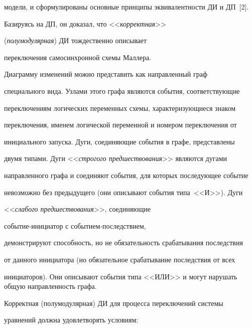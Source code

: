 модели, и сформулированы основные принципы эквивалентности ДИ и ДП~[2]. 


Базируясь на ДП, он доказал, что <<\textit{корректная}>> 


(\textit{полумодулярная}) ДИ тождественно описывает 


переключения самосинхронной схемы Маллера. 


      


      Диаграмму изменений можно представить как направленный граф 


специального вида. Узлами этого графа являются события, соответствующие 


переключениям логических переменных схемы, характеризующиеся знаком 


переключения, именем логической переменной и номером переключения от 


инициального запуска. Дуги, соединяющие события в графе, представлены 


двумя типами. Дуги <<\textit{строгого предшествования}>> являются дугами 


направленного графа и соединяют события, для которых последующее событие 


невозможно без предыдущего (они описывают события типа~<<И>>). Дуги 


<<\textit{слабого предшествования}>>, соединяющие 


      со\-бы\-тие-ини\-ци\-а\-тор с со\-бы\-ти\-ем-по\-след\-ст\-ви\-ем, 


демонстрируют способность, но не обязательность срабатывания последствия 


от данного инициатора (но обязательное срабатывание последствия от всех 


инициаторов). Они описывают события типа <<ИЛИ>> и могут нарушать общую направленность графа. 


      


      Корректная (полумодулярная) ДИ для процесса переключений системы 


уравнений должна удовлетворять условиям:


